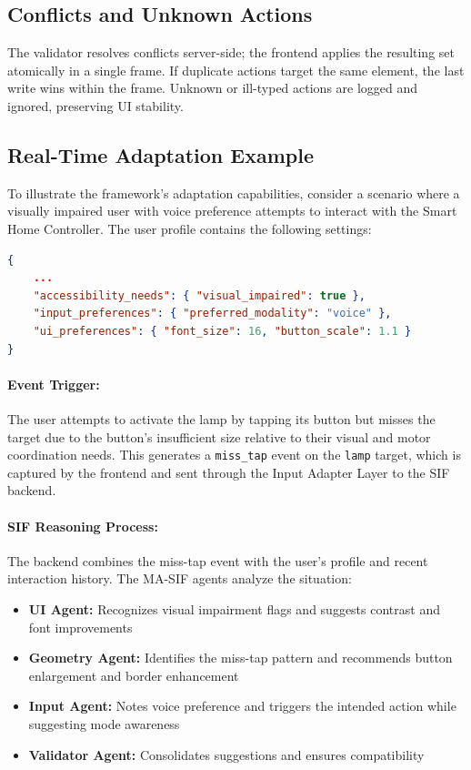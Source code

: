 \subsection{Conflicts and Unknown Actions}
The validator resolves conflicts server-side; the frontend applies the resulting set atomically in a single frame. If duplicate actions target the same element, the last write wins within the frame. Unknown or ill-typed actions are logged and ignored, preserving UI stability.

\subsection{Real-Time Adaptation Example}
To illustrate the framework's adaptation capabilities, consider a scenario where a visually impaired user with voice preference attempts to interact with the Smart Home Controller. The user profile contains the following settings:

\begin{lstlisting}[language=json, caption={User profile for visually impaired user, shortened}]
{
    ...
    "accessibility_needs": { "visual_impaired": true },
    "input_preferences": { "preferred_modality": "voice" },
    "ui_preferences": { "font_size": 16, "button_scale": 1.1 }
}
\end{lstlisting}

\paragraph{Event Trigger:} The user attempts to activate the lamp by tapping its button but misses the target due to the button's insufficient size relative to their visual and motor coordination needs. This generates a \texttt{miss\_tap} event on the \texttt{lamp} target, which is captured by the frontend and sent through the Input Adapter Layer to the SIF backend.

\paragraph{SIF Reasoning Process:} The backend combines the miss-tap event with the user's profile and recent interaction history. The MA-SIF agents analyze the situation:
\begin{itemize}
        \item \textbf{UI Agent:} Recognizes visual impairment flags and suggests contrast and font improvements
        \item \textbf{Geometry Agent:} Identifies the miss-tap pattern and recommends button enlargement and border enhancement
        \item \textbf{Input Agent:} Notes voice preference and triggers the intended action while suggesting mode awareness
        \item \textbf{Validator Agent:} Consolidates suggestions and ensures compatibility
\end{itemize}


